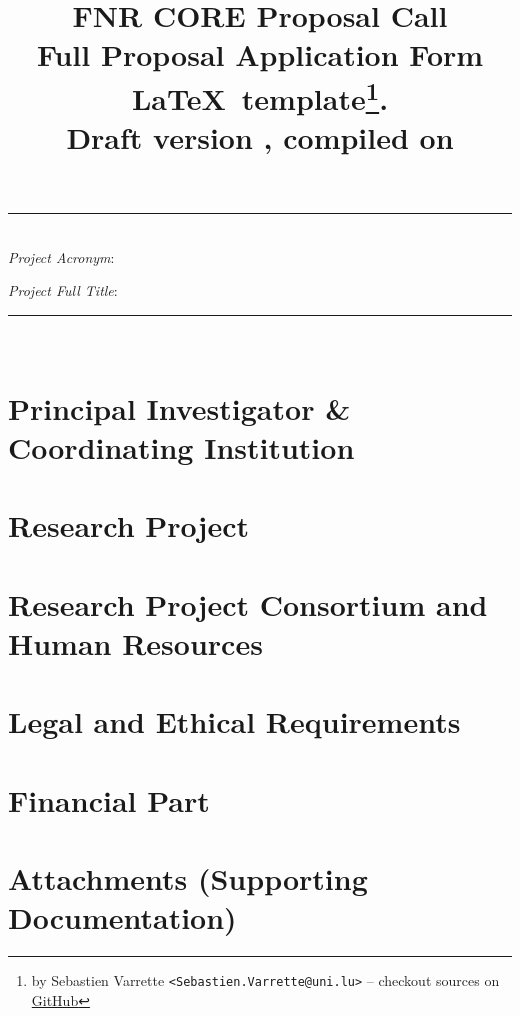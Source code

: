 \documentclass[11pt,twoside,a4paper]{article}
\title{\textbf{\Large FNR CORE Proposal Call} \\[1em]
  {\small Full Proposal Application Form \LaTeX\ template\thanks{by Sebastien
      Varrette {\small \texttt{<Sebastien.Varrette@uni.lu>}} -- checkout sources
      on \href{https://github.com/Falkor/fnr-latex-template}{GitHub}}.\\
    \textbf{Draft version \docversion}, compiled on \isodayandtime}
}
\author{}
\date{}
\begin{document}
\maketitle
{\Large
  \begin{center}
      \hrule
      ~\\
      \emph{Project Acronym}: \project

      \emph{Project Full Title}: \fulltitle\\[1em]
  \end{center}
}
\hrule
~\\[1em]

\clearpage
\tableofcontents
\clearpage

\section{Principal Investigator \& Coordinating Institution}


\section{Research Project}

  
\section{Research Project Consortium and Human Resources}

  
\section{Legal and Ethical Requirements}


\section{Financial Part}


\section{Attachments (Supporting Documentation)}
\end{document}
